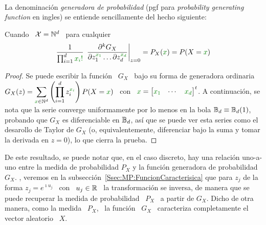 \

La denominaci\'on  {\em generadora de  probabilidad} (pgf para  {\em probability
  generating function} en ingles) se entiende sencillamente del hecho siguiente:
%
\begin{lema}
\label{Lem:MP:GeneracionProbabilidades}
%
  Cuando \ $\mathcal{X} = \mathbb{N}^d$ \ para cualquier \ 
  \[
  \frac1{\prod_{i=1}^d  \modif{x_i!}} \, \left.\frac{\partial^k  G_X}{\partial z_1^{\modif{x_1}}
      \ldots \partial z_d^{\modif{x_d}}}\right|_{z=0} = P_X(\modif{x}) = P(X = \modif{x})
  \]
\end{lema}
%
\begin{proof}
  Se puede escribir la funci\'on \ $G_X$ \ bajo su forma de generadora ordinaria
  \ $\displaystyle  G_X(z) =  \sum_{\modif{x} \in \Nset^d}  \left( \prod_{i=1}^d
    z_i^{\modif{x_i}}   \right)   P(X  =   \modif{x})$   \   con  \   $\modif{x}
  =  \begin{bmatrix} \modif{x_1}  &  \cdots &  \modif{x_d} \end{bmatrix}^t$.   A
  continuaci\'on, se nota que la serie converge uniformamente por lo menos en la
  bola  $\mathbb{B}_d \equiv  \mathbb{B}_d(1)$,  probando que  $G_X$  es diferenciable  en
  $\mathbb{B}_d$, as\'i que  se puede ver esta series como el  desarollo de Taylor de
  $G_X$ (o, equivalentemente, diferenciar bajo la suma y tomar la derivada en $z
  = 0$), lo que cierra la prueba.
\end{proof}

De este resultado,  se puede notar que, en el caso  discreto, hay una relaci\'on
uno-a-uno entre  la medida  de probabilidad $P_X$  y la funci\'on  generadora de
probabilidad   $G_X$.     ,    veremos   en   la
subsecci\'on~\ref{Ssec:MP:FuncionCaracterisica} que para  $z_j$ de la forma $z_j
= e^{\imath u_j}$ \  con \ $u_j \in \mathbb{R}$ \ la  transformaci\'on se inversa, de
manera que se  puede recuperar la medida  de probabilidad \ $P_X$ \  a partir de
$G_X$. Dicho de  otra manera, como la medida  \ $P_X$, \ la funci\'on  \ $G_X$ \
caracteriza completamente el vector aleatorio \ $X$.

\

